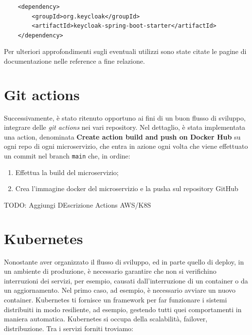 \documentclass{article}
\begin{document}
\begin{verbatim}
    <dependency>
        <groupId>org.keycloak</groupId>
        <artifactId>keycloak-spring-boot-starter</artifactId>
    </dependency>
\end{verbatim}

Per ulteriori approfondimenti sugli eventuali utilizzi sono state citate le pagine di documentazione nelle reference a fine relazione.

\pagebreak

\section{Git actions}

Successivamente, è stato ritenuto opportuno ai fini di un buon flusso di sviluppo, integrare delle \textit{git actions} nei vari repository.
Nel dettaglio, è stata implementata una action, denominata \textbf{Create action build and push on Docker Hub} su ogni repo di ogni microservizio, che entra in azione ogni volta che viene effettuato un commit nel 
branch \texttt{main} che, in ordine:

\begin{enumerate}
    \item Effettua la build del microservizio;
    \item Crea l'immagine docker del microservizio e la pusha sul repository GitHub
\end{enumerate}

TODO: Aggiungi DEscrizione Actions AWS/K8S


\section{Kubernetes}

Nonostante aver organizzato il flusso di sviluppo, ed in parte quello di deploy, in un ambiente di produzione, è necessario garantire che non si verifichino interruzioni
dei servizi, per esempio, causati dall'interruzione di un container o da un aggiornamento. Nel primo caso, ad esempio, è necessario avviare un nuovo
container. Kubernetes ti fornisce un framework per far funzionare i sistemi distribuiti in modo resiliente, ad esempio, gestendo
tutti quei comportamenti in maniera automatica. Kubernetes si occupa della scalabilità, failover, distribuzione. Tra i servizi forniti troviamo:
\end{document}

